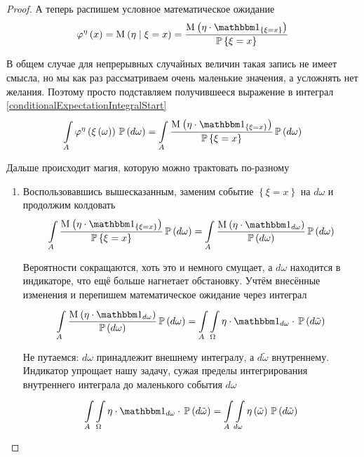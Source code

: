 \begin{proof}
А теперь распишем условное математическое ожидание
$$\varphi^{\eta}\left( x \right)
    = \mean{\left( \eta \mid \xi = x \right)}
    = \frac{\mean{\left( \eta
        \cdot \indicatorof{\left\{ \xi = x \right\}} \right)}}
        {\Probability{\xi = x}}$$

В общем случае для непрерывных случайных величин такая запись не имеет смысла,
но мы как раз рассматриваем очень маленькие значения,
а усложнять нет желания.
Поэтому просто подставляем получившееся выражение
в интеграл \eqref{conditionalExpectationIntegralStart}
\begin{equation}\label{conditionalExpectationMagic}
    \integrall{A}{\probability{d\omega}}{
        \varphi^{\eta}\left( \xi\left( \omega \right) \right)}
        = \integrall{A}{\probability{d\omega}}{
            \frac{\mean{\left( \eta
                \cdot \indicatorof{\left\{ \xi = x \right\}} \right)}}
                {\Probability{\xi = x}}}
\end{equation}


Дальше происходит магия, которую можно трактовать по-разному
\begin{enumerate}[label=\bfseries Формулировка \arabic*:]
    \item
        Воспользовавшись вышесказанным,
        заменим событие $\left\{ \xi = x \right\}$
        на $d\omega$ и продолжим колдовать
        $$\integrall{A}{\probability{d\omega}}{
            \frac{\mean{\left( \eta
                \cdot \indicatorof{\left\{ \xi = x \right\}} \right)}}
                {\Probability{\xi = x}}}
            = \integrall{A}{\probability{d\omega}}{
                \frac{\mean{\left( \eta \cdot \indicatorof{d\omega} \right)}}
                    {\probability{d\omega}}}$$

        Вероятности сокращаются, хоть это и немного смущает,
        а $d\omega$ находится в индикаторе, что ещё больше нагнетает обстановку.
        Учтём внесённые изменения и перепишем
        математическое ожидание через интеграл
        $$\integrall{A}{\probability{d\omega}}{
            \frac{\mean{\left( \eta \cdot \indicatorof{d\omega} \right)}}
                {\probability{d\omega}}}
            = \int\limits_A \integrall{\Omega}{\probability{d\tilde{\omega}}}{
                \eta \cdot \indicatorof{d\omega} \cdot}$$

        Не путаемся: $d\omega$ принадлежит внешнему интегралу,
        а $d\tilde{\omega}$ внутреннему.
        Индикатор упрощает нашу задачу,
        сужая пределы интегрирования внутреннего интеграла
        до маленького события $d\omega$
        $$\int\limits_A \integrall{\Omega}{\probability{d\tilde{\omega}}}{
                \eta \cdot \indicatorof{d\omega} \cdot}
                = \int\limits_A \integrall{d\omega}
                    {\probability{d\tilde{\omega}}}
                    {\eta\left( \tilde{\omega}\right)}$$


\end{enumerate}
\end{proof}
